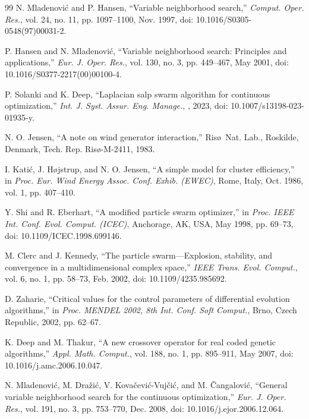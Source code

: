 \begin{thebibliography}{99}
N. Mladenovi\'c and P. Hansen, ``Variable neighborhood search,'' \textit{Comput. Oper. Res.}, vol. 24, no. 11, pp. 1097--1100, Nov. 1997, doi: 10.1016/S0305-0548(97)00031-2.

P. Hansen and N. Mladenovi\'c, ``Variable neighborhood search: Principles and applications,'' \textit{Eur. J. Oper. Res.}, vol. 130, no. 3, pp. 449--467, May 2001, doi: 10.1016/S0377-2217(00)00100-4.

P. Solanki and K. Deep, ``Laplacian salp swarm algorithm for continuous optimization,'' \textit{Int. J. Syst. Assur. Eng. Manage.}, , 2023, doi: 10.1007/s13198-023-01935-y.

N. O. Jensen, ``A note on wind generator interaction,'' Ris\o\ Nat. Lab., Roskilde, Denmark, Tech. Rep. Ris\o-M-2411, 1983.

I. Kati\'c, J. H\o jstrup, and N. O. Jensen, ``A simple model for cluster efficiency,'' in \textit{Proc. Eur. Wind Energy Assoc. Conf. Exhib. (EWEC)}, Rome, Italy, Oct. 1986, vol. 1, pp. 407--410.

Y. Shi and R. Eberhart, ``A modified particle swarm optimizer,'' in \textit{Proc. IEEE Int. Conf. Evol. Comput. (ICEC)}, Anchorage, AK, USA, May 1998, pp. 69--73, doi: 10.1109/ICEC.1998.699146.

M. Clerc and J. Kennedy, ``The particle swarm---Explosion, stability, and convergence in a multidimensional complex space,'' \textit{IEEE Trans. Evol. Comput.}, vol. 6, no. 1, pp. 58--73, Feb. 2002, doi: 10.1109/4235.985692.

D. Zaharie, ``Critical values for the control parameters of differential evolution algorithms,'' in \textit{Proc. MENDEL 2002, 8th Int. Conf. Soft Comput.}, Brno, Czech Republic, 2002, pp. 62--67.

K. Deep and M. Thakur, ``A new crossover operator for real coded genetic algorithms,'' \textit{Appl. Math. Comput.}, vol. 188, no. 1, pp. 895--911, May 2007, doi: 10.1016/j.amc.2006.10.047.

N. Mladenovi\'c, M. Dra\v{z}i\'c, V. Kova\v{c}evi\'c-Vuj\v{c}i\'c, and M. \v{C}angalovi\'c, ``General variable neighborhood search for the continuous optimization,'' \textit{Eur. J. Oper. Res.}, vol. 191, no. 3, pp. 753--770, Dec. 2008, doi: 10.1016/j.ejor.2006.12.064.


\end{thebibliography}

